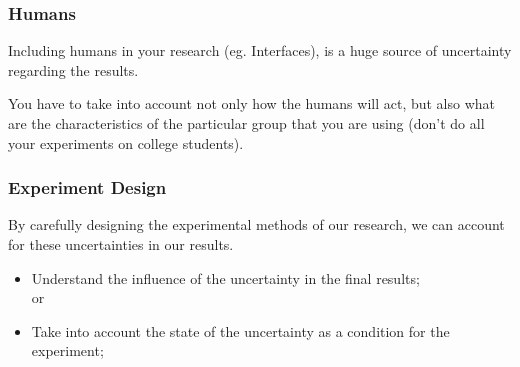 \documentclass{beamer}
\begin{document}
\begin{frame}
  \frametitle{Humans}
  \begin{block}{}
    Including humans in your research (eg. Interfaces), is a huge
    source of uncertainty regarding the results.
    \medskip

    You have to take into account not only how the humans will act,
    but also what are the characteristics of the particular group that
    you are using (don't do all your experiments on college students).
  \end{block}
\end{frame}

\begin{frame}
  \frametitle{Experiment Design}

  By carefully designing the experimental methods of our research, we
  can account for these uncertainties in our results.
  \bigskip
  \begin{itemize}
  \item Understand the influence of the uncertainty in the final results;\\
    or
  \item Take into account the state of the uncertainty as a condition
    for the experiment;
  \end{itemize}
\end{frame}
\end{document}
